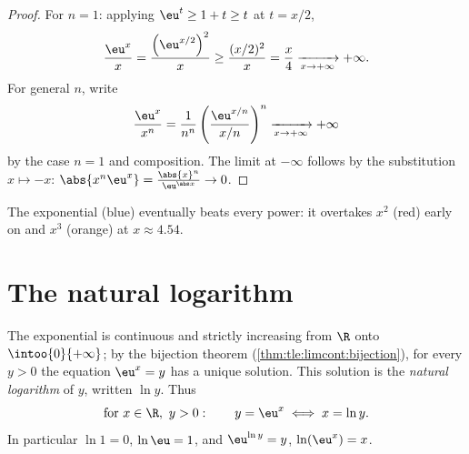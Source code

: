 \begin{proof}
For $n = 1$: applying $\eu^t \geq 1 + t \geq t$ at $t = x/2$,
\[
\frac{\eu^x}{x} = \frac{\left(\eu^{x/2}\right)^2}{x}
\geq \frac{(x/2)^2}{x} = \frac{x}{4} \xrightarrow[x\to+\infty]{} +\infty .
\]
For general $n$, write
\[
\frac{\eu^x}{x^n}
= \frac{1}{n^n}\left(\frac{\eu^{x/n}}{x/n}\right)^{n}
\xrightarrow[x\to+\infty]{} +\infty
\]
by the case $n=1$ and composition. The limit at $-\infty$ follows by the
substitution $x \mapsto -x$:
$\abs{x^n \eu^x} = \frac{\abs{x}^n}{\eu^{\abs x}} \to 0$.
\end{proof}

\begin{omfigure}

{\small The exponential (blue) eventually beats every power: it
overtakes $x^2$ (red) early on and $x^3$ (orange) at $x \approx 4.54$.}
\end{omfigure}

\section{The natural logarithm}

\begin{definition}\label{def:tle:exp:ln}
The exponential is continuous and strictly increasing from $\R$ onto
$\intoo{0}{+\infty}$; by the bijection theorem
(\cref{thm:tle:limcont:bijection}), for every $y > 0$ the equation
$\eu^x = y$ has a unique solution. This solution is the \emph{natural
logarithm} of $y$, written $\ln y$. Thus
\[
\text{for } x \in \R,\ y > 0: \qquad y = \eu^x \iff x = \ln y .
\]
In particular $\ln 1 = 0$, $\ln \eu = 1$, and
$\eu^{\ln y} = y$, $\ln(\eu^x) = x$.
\end{definition}

